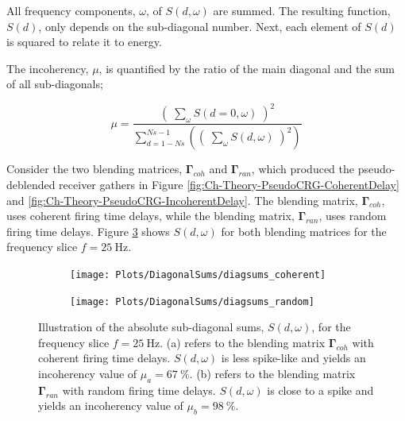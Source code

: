 All frequency components, $\omega$, of $S(d,\omega)$ are summed. The resulting function, $S(d)$, only depends on the sub-diagonal number. Next, each element of $S(d)$ is squared to relate it to energy. 

The incoherency, $\mu$, is quantified by the ratio of the main diagonal and the sum of all sub-diagonals;

\begin{equation}
	\mu = \frac{\left( \; \sum_{\omega}S(d=0,\omega) \; \right)^2}{\sum_{d = 1-Ns}^{Ns-1} \left(\left( \; \sum_{\omega}S(d,\omega) \; \right)^2\right)}
	\label{eq:Ch-Results-incoherency}
\end{equation}

Consider the two blending matrices, $\mathbf{\Gamma}_{coh}$ and $\mathbf{\Gamma}_{ran}$, which produced the pseudo-deblended receiver gathers in Figure \ref{fig:Ch-Theory-PseudoCRG-CoherentDelay} and \ref{fig:Ch-Theory-PseudoCRG-IncoherentDelay}. The blending matrix, $\mathbf{\Gamma}_{coh}$, uses coherent firing time delays, while the blending matrix, $\mathbf{\Gamma}_{ran}$, uses random firing time delays. Figure \ref{fig:Ch-Incoherency-Coh-vs-Ran-Diag} shows $S(d,\omega)$ for both blending matrices for the frequency slice $f=\SI{25}{\hertz}$.

\begin{figure}
	
	\centering
	\begin{subfigure}[b]{0.45\textwidth}
	\centering
	\texttt{[image: Plots/DiagonalSums/diagsums\_coherent]}	
	\caption{}
	\label{fig:Ch-Incoherency-CoherentDiag}	
	\end{subfigure}
	\centering
	\begin{subfigure}[b]{0.45\textwidth}
	\centering
	\texttt{[image: Plots/DiagonalSums/diagsums\_random]}	
	\caption{}
	\label{fig:Ch-Incoherency-RandomDiag}	
	\end{subfigure}
	
	\caption{Illustration of the absolute sub-diagonal sums, $S(d,\omega)$, for the frequency slice $f=\SI{25}{\hertz}$. (a) refers to the blending matrix $\mathbf{\Gamma}_{coh}$ with coherent firing time delays.  $S(d,\omega)$ is less spike-like and yields an incoherency value of $\mu_a = \SI{67}{\percent}$. (b) refers to the blending matrix $\mathbf{\Gamma}_{ran}$ with random firing time delays. $S(d,\omega)$ is  close to a spike and yields an incoherency value of $\mu_b = \SI{98}{\percent}$.}
	\label{fig:Ch-Incoherency-Coh-vs-Ran-Diag}
	
\end{figure}


